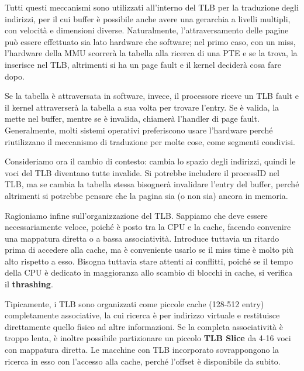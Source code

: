 \noindent Tutti questi meccanismi sono utilizzati all'interno del TLB per la traduzione degli indirizzi, per il cui buffer è possibile anche avere una
gerarchia a livelli multipli, con velocità e dimensioni diverse. Naturalmente, l'attraversamento delle pagine può essere effettuato sia lato hardware
che software; nel primo caso, con un miss, l'hardware della MMU scorrerà la tabella alla ricerca di una PTE e se la trova, la inserisce nel TLB,
altrimenti si ha un page fault e il kernel deciderà cosa fare dopo.\par
Se la tabella è attraversata in software, invece, il processore riceve un TLB fault e il kernel attraverserà la tabella a sua volta per trovare
l'entry. Se è valida, la mette nel buffer, mentre se è invalida, chiamerà l'handler di page fault. Generalmente, molti sistemi operativi preferiscono
usare l'hardware perché riutilizzano il meccanismo di traduzione per molte cose, come segmenti condivisi.\par
Consideriamo ora il cambio di contesto: cambia lo spazio degli indirizzi, quindi le voci del TLB diventano tutte invalide. Si potrebbe includere il
processID nel TLB, ma se cambia la tabella stessa bisognerà invalidare l'entry del buffer, perché altrimenti si potrebbe pensare che la pagina sia
(o non sia) ancora in memoria.\par
Ragioniamo infine sull'organizzazione del TLB. Sappiamo che deve essere necessariamente veloce, poiché è posto tra la CPU e la cache, facendo convenire
una mappatura diretta o a bassa associatività. Introduce tuttavia un ritardo prima di accedere alla cache, ma è conveniente usarlo se il miss time è
molto più alto rispetto a esso. Bisogna tuttavia stare attenti ai conflitti, poiché se il tempo della CPU è dedicato in maggioranza allo scambio di
blocchi in cache, si verifica il \textbf{thrashing}.\par
Tipicamente, i TLB sono organizzati come piccole cache (128-512 entry) completamente associative, la cui ricerca è per indirizzo virtuale e restituisce
direttamente quello fisico ad altre informazioni. Se la completa associatività è troppo lenta, è inoltre possibile partizionare un piccolo \textbf{TLB
Slice} da 4-16 voci con mappatura diretta. Le macchine con TLB incorporato sovrappongono la ricerca in esso con l'accesso alla cache, perché l'offset è
disponibile da subito.

%

